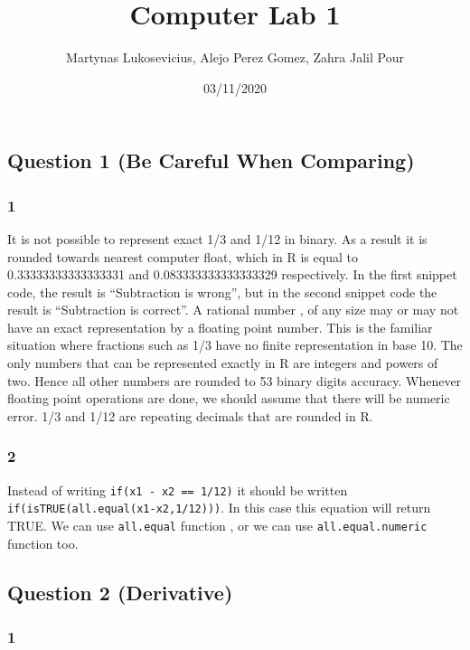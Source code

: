 \documentclass[
]{article}
\title{Computer Lab 1}
\author{Martynas Lukosevicius, Alejo Perez Gomez, Zahra Jalil Pour}
\date{03/11/2020}
\begin{document}
\maketitle

\hypertarget{question-1-be-careful-when-comparing}{%
\subsection{Question 1 (Be Careful When
Comparing)}\label{question-1-be-careful-when-comparing}}

\hypertarget{section}{%
\subsubsection{1}\label{section}}

It is not possible to represent exact 1/3 and 1/12 in binary. As a
result it is rounded towards nearest computer float, which in R is equal
to 0.33333333333333331 and 0.083333333333333329 respectively. In the
first snippet code, the result is ``Subtraction is wrong'', but in the
second snippet code the result is ``Subtraction is correct''. A rational
number , of any size may or may not have an exact representation by a
floating point number. This is the familiar situation where fractions
such as 1/3 have no finite representation in base 10. The only numbers
that can be represented exactly in R are integers and powers of two.
Hence all other numbers are rounded to 53 binary digits accuracy.
Whenever floating point operations are done, we should assume that there
will be numeric error. 1/3 and 1/12 are repeating decimals that are
rounded in R.

\hypertarget{section-1}{%
\subsubsection{2}\label{section-1}}

Instead of writing \texttt{if(x1\ -\ x2\ ==\ 1/12)} it should be written
\texttt{if(isTRUE(all.equal(x1-x2,1/12)))}. In this case this equation
will return TRUE. We can use \texttt{all.equal} function , or we can use
\texttt{all.equal.numeric} function too.

\hypertarget{question-2-derivative}{%
\subsection{Question 2 (Derivative)}\label{question-2-derivative}}

\hypertarget{section-2}{%
\subsubsection{1}\label{section-2}}
\end{document}
